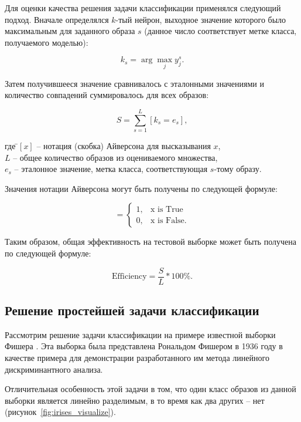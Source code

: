 Для оценки качества решения задачи классификации применялся следующий подход. Вначале определялся $k$-тый нейрон, выходное значение которого было максимальным для заданного образа $s$ (данное число соответствует метке класса, получаемого моделью):

\begin{equation}
  k_s = \arg \max_j y_j^s.
\end{equation}

Затем получившееся значение сравнивалось с эталонными значениями и количество совпадений суммировалось для всех образов:

\begin{equation}
  S = \sum_{s=1}^{L} [k_s = e_s],
\end{equation}
\begin{tabbing}  
где \=$[x]$ -- нотация (скобка) Айверсона для высказывания $x$,\\
\>$L$ -- общее количество образов из оцениваемого множества,\\
\>$e_s$ -- эталонное значение, метка класса, соответствующая $s$-тому образу.
\end{tabbing}

Значения нотации Айверсона могут быть получены по следующей формуле:

\begin{equation*}
    [x] = 
    \begin{cases}
        1, & \text{x is True} \\
        0, & \text{x is False}.
    \end{cases}
\end{equation*}

Таким образом, общая эффективность на тестовой выборке может быть получена по следующей формуле:

\begin{equation}
\text{Efficiency} = \frac{S}{L} * 100\%.
\end{equation}

\subsection{Решение простейшей задачи классификации}

Рассмотрим решение задачи классификации на примере известной выборки Фишера \cite[c.~180]{Fisher}. Эта выборка была представлена Рональдом Фишером в 1936 году в качестве примера для демонстрации разработанного им метода линейного дискриминантного анализа.

Отличительная особенность этой задачи в том, что один класс образов из данной выборки является линейно разделимым, в то время как два других -- нет (рисунок~\ref{fig:irises_visualize}).

